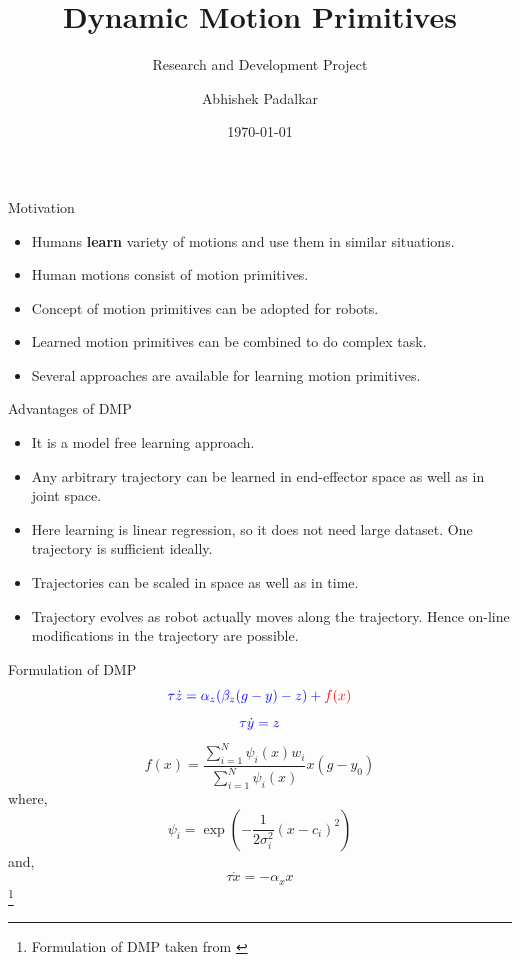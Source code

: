 \documentclass{beamer}
\author[]{Abhishek Padalkar}
\title{Dynamic Motion Primitives}
\subtitle{Research and Development Project}
\institute[HBRS]{Hochschule Bonn-Rhein-Sieg}
\date{\today}
\begin{document}
	{
	\begin{frame}
	\titlepage
	\end{frame}
	}
	
	\begin{frame}{Motivation}
		\begin{itemize}
			\item Humans \textbf{learn} variety of motions and use them in similar situations. 
			\item Human motions consist of motion primitives. 
			\item Concept of motion primitives can be adopted for robots. 
			\item Learned motion primitives can be combined to do complex task. 
			\item Several approaches are available for learning motion primitives.
		\end{itemize}
	\end{frame}
	
	
	\begin{frame}{Advantages of DMP}
		\begin{itemize}
			\item It is a model free learning approach.
			\item Any arbitrary trajectory can be learned in end-effector space as well as in joint space.
			\item Here learning is linear regression, so it does not need large dataset.
			One trajectory is sufficient ideally.
			\item Trajectories can be scaled in space as well as in time.
			\item Trajectory evolves as robot actually moves along the trajectory. Hence on-line modifications in the trajectory are possible.

		\end{itemize}
	\end{frame}

	\begin{frame}{Formulation of DMP}
		\begin{equation}\label{DMP_1}
		\color{blue}\tau\dot{z} = \alpha_{z}(\beta_{z}(g - y) - z) + \color{red}f(x) \color{black}
		\end{equation}
		\begin{equation}\label{DMP_2}
		\color{blue}\tau \dot{y} = z \color{black}
		\end{equation}
		\begin{equation}\label{forcing_term}
		f(x) = \frac{\sum_{i=1}^{N}\psi_{i}(x)w_{i}}{\sum_{i=1}^{N}\psi_{i}(x)}x(g - y_{0})
		\end{equation}
		where,
		\begin{equation}\label{psi}
		\psi_{i} = \exp(-{\frac{1}{2\sigma_{i}^{2}}(x - c_{i})^{2}})
		\end{equation}
		and,
		\begin{equation}\label{canonical}
		\tau \dot{x} = -\alpha_{x}x
		\end{equation}
		\footnote{Formulation of DMP taken from \cite{ijspeert2013dynamical}}
	\end{frame}
	
\end{document}
